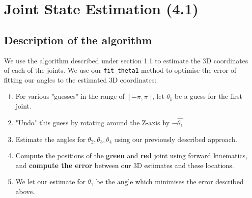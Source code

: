 \section{Joint State Estimation (4.1)}

\subsection{Description of the algorithm}
We use the algorithm described under section 1.1 to estimate the
3D coordinates of each of the joints.
We use our \texttt{fit\_theta1} method to optimise the error of fitting
our angles to the estimated 3D coordinates:
\begin{enumerate}
    \item
        For various "guesses" in the range of $[-\pi, \pi]$, let
        $\hat{\theta_1}$ be a guess for the first joint.
    \item
        "Undo" this guess by rotating around the Z-axis by $-\hat{\theta_1}$
    \item
        Estimate the angles for $\theta_2, \theta_3, \theta_4$ using our
        previously described approach.
    \item
        Compute the positions of the \textbf{green} and \textbf{red}
        joint using forward kinematics, and \textbf{compute the error}
        between our 3D estimates and these locations.
    \item
        We let our estimate for $\theta_1$ be the angle which minimises
        the error described above.

\end{enumerate}

